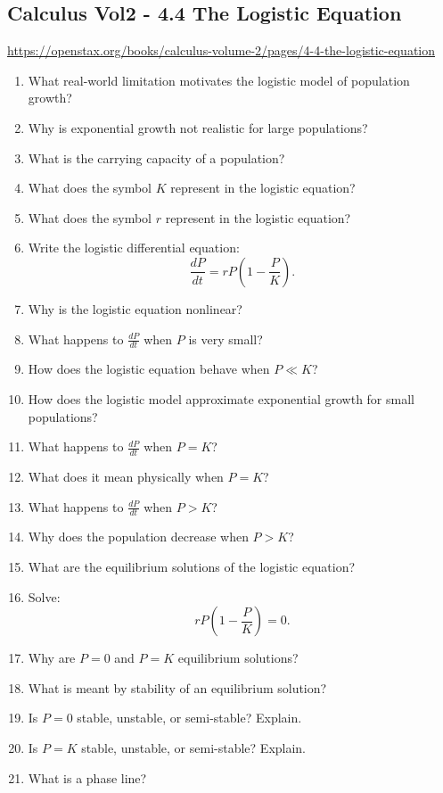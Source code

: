\subsection{Calculus Vol2 - 4.4 The Logistic Equation}

\url{https://openstax.org/books/calculus-volume-2/pages/4-4-the-logistic-equation}

\begin{enumerate}
  \item What real-world limitation motivates the logistic model of population growth?
  \item Why is exponential growth not realistic for large populations?
  \item What is the carrying capacity of a population?
  \item What does the symbol $K$ represent in the logistic equation?
  \item What does the symbol $r$ represent in the logistic equation?
  \item Write the logistic differential equation:
    \[
      \frac{dP}{dt} = rP\left(1 - \frac{P}{K}\right).
    \]
  \item Why is the logistic equation nonlinear?
  \item What happens to $\frac{dP}{dt}$ when $P$ is very small?
  \item How does the logistic equation behave when $P \ll K$?
  \item How does the logistic model approximate exponential growth for small populations?
  \item What happens to $\frac{dP}{dt}$ when $P = K$?
  \item What does it mean physically when $P = K$?
  \item What happens to $\frac{dP}{dt}$ when $P > K$?
  \item Why does the population decrease when $P > K$?
  \item What are the equilibrium solutions of the logistic equation?
  \item Solve:
    \[
      rP\left(1 - \frac{P}{K}\right) = 0.
    \]
  \item Why are $P=0$ and $P=K$ equilibrium solutions?
  \item What is meant by stability of an equilibrium solution?
  \item Is $P=0$ stable, unstable, or semi-stable? Explain.
  \item Is $P=K$ stable, unstable, or semi-stable? Explain.
  \item What is a phase line?

\end{enumerate}
